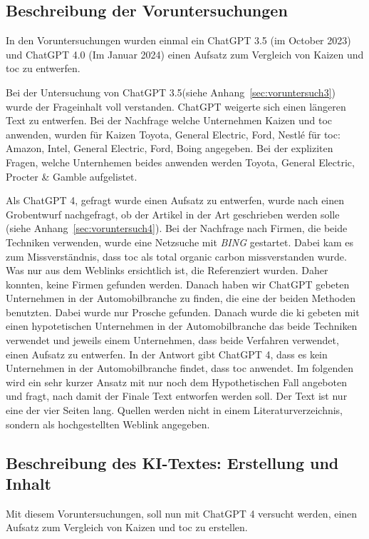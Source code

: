 
\subsection{Beschreibung der Voruntersuchungen}

In den Voruntersuchungen wurden einmal ein ChatGPT 3.5 (im October 2023) und ChatGPT 4.0 (Im Januar 2024)
einen Aufsatz zum Vergleich von Kaizen und \gls{toc} zu entwerfen.

Bei der Untersuchung von ChatGPT 3.5(siehe Anhang~\ref{sec:voruntersuch3}) wurde der Frageinhalt voll verstanden. ChatGPT weigerte sich einen längeren Text zu entwerfen.
Bei der Nachfrage welche Unternehmen Kaizen und \gls{toc} anwenden, wurden für Kaizen Toyota, General Electric, Ford, Nestlé  für \gls{toc}: Amazon, Intel, General Electric, Ford, Boing angegeben. Bei der expliziten Fragen, welche Unternhemen beides anwenden werden Toyota, General Electric, Procter \& Gamble aufgelistet.

Als ChatGPT 4, gefragt wurde einen Aufsatz zu entwerfen, wurde nach einen Grobentwurf nachgefragt, ob der Artikel in der Art geschrieben werden solle (siehe Anhang~\ref{sec:voruntersuch4}). Bei der Nachfrage nach Firmen, die beide Techniken verwenden, wurde eine Netzsuche mit \textit{BING} gestartet. Dabei kam es zum Missverständnis, dass \gls{toc} als total organic carbon missverstanden wurde. Was nur aus dem Weblinks ersichtlich ist, die Referenziert wurden. Daher konnten, keine Firmen gefunden werden. Danach haben wir ChatGPT gebeten Unternehmen in der Automobilbranche zu finden, die eine der beiden Methoden benutzten. Dabei wurde nur Prosche gefunden. Danach wurde die \gls{ki} gebeten mit einen hypotetischen Unternehmen in der Automobilbranche das beide Techniken verwendet und jeweils einem Unternehmen, dass beide Verfahren verwendet, einen Aufsatz zu entwerfen. In der Antwort gibt ChatGPT 4, dass es kein Unternehmen in der Automobilbranche findet, dass \gls{toc} anwendet. Im folgenden wird ein sehr kurzer Ansatz mit nur noch dem Hypothetischen Fall angeboten und fragt, nach damit der Finale Text entworfen werden soll. Der Text ist nur eine der vier Seiten lang. Quellen werden nicht in einem Literaturverzeichnis, sondern als hochgestellten Weblink angegeben.

\subsection{Beschreibung des KI-Textes: Erstellung und Inhalt}

Mit diesem Voruntersuchungen, soll nun mit ChatGPT 4 versucht werden, einen Aufsatz zum Vergleich von Kaizen und \gls{toc} zu erstellen. 

